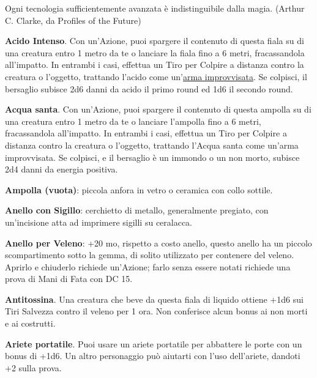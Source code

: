 \begin{multicols}{2}
\medskip

\begin{enfasi}{
Ogni tecnologia sufficientemente avanzata è indistinguibile dalla magia. (Arthur C. Clarke, da Profiles of the Future)
}\end{enfasi}

\medskip

\textbf{Acido Intenso}\label{Acido Intenso}\hypertarget{Acido Intenso}{}. Con un'Azione, puoi spargere il contenuto di questa fiala su di una creatura entro 1 metro da te o lanciare la fiala fino a 6 metri, fracassandola all'impatto. In entrambi i casi, effettua un Tiro per Colpire a distanza contro la creatura o l'oggetto, trattando l'acido come un'\hyperlink{armaimprovvisata}{arma improvvisata}. Se colpisci, il bersaglio subisce 2d6 danni da acido il primo round ed 1d6 il secondo round.

\textbf{Acqua santa}\label{Acqua santa}\hypertarget{Acqua santa}{}. Con un'Azione, puoi spargere il contenuto di questa ampolla su di una creatura entro 1 metro da te o lanciare l'ampolla fino a 6 metri, fracassandola all'impatto. In entrambi i casi, effettua un Tiro per Colpire a distanza contro la creatura o l'oggetto, trattando l'Acqua santa come un'arma improvvisata. Se colpisci, e il bersaglio è un immondo o un non morto, subisce 2d4 danni da energia positiva.

\textbf{Ampolla (vuota)}: piccola anfora in vetro o ceramica con collo sottile.

\textbf{Anello con Sigillo}: cerchietto di metallo, generalmente pregiato, con un'incisione atta ad imprimere sigilli su ceralacca.

\textbf{Anello per Veleno}\label{Anello per veleno}\hypertarget{Anello per veleno}{}: +20 mo, rispetto a costo anello, questo anello ha un piccolo scompartimento sotto la gemma, di solito utilizzato per contenere del veleno. Aprirlo e chiuderlo richiede un'Azione; farlo senza essere notati richiede una prova di Mani di Fata con DC 15.

\textbf{Antitossina}\label{Antitossina}\hypertarget{Antitossina}{}. Una creatura che beve da questa fiala di liquido ottiene +1d6 sui Tiri Salvezza contro il veleno per 1 ora. Non conferisce alcun bonus ai non morti e ai costrutti.

\textbf{Ariete portatile}\label{Ariete portatile}\hypertarget{Ariete portatile}{}. Puoi usare un ariete portatile per abbattere le porte con un bonus di +1d6. Un altro personaggio può aiutarti con l'uso dell'ariete, dandoti +2 sulla prova.


\end{multicols}
